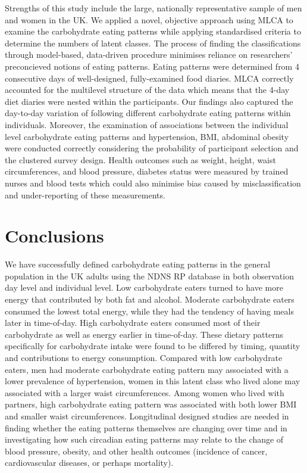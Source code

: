 Strengths of this study include the large, nationally representative sample of men and women in the UK. We applied a novel, objective approach using MLCA to examine the carbohydrate eating patterns while applying standardised criteria to determine the numbers of latent classes. The process of finding the classifications through model-based, data-driven procedure minimises reliance on researchers' preconcieved notions of eating patterns. Eating patterns were determined from 4 consecutive days of well-designed, fully-examined food diaries. MLCA correctly accounted for the multilevel structure of the data which means that the 4-day diet diaries were nested within the participants. Our findings also captured the day-to-day variation of following different carbohydrate eating patterns within individuals. Moreover, the examination of associations between the individual level carbohydrate eating patterns and hypertension, BMI, abdominal obesity were conducted correctly considering the probability of participant selection and the clustered survey design. Health outcomes such as weight, height, waist circumferences, and blood pressure, diabetes status were measured by trained nurses and blood tests which could also minimise bias caused by misclassification and under-reporting of these measurements.

\section{Conclusions}

We have successfully defined carbohydrate eating patterns in the general population in the UK adults using the NDNS RP database in both observation day level and individual level. Low carbohydrate eaters turned to have more energy that contributed by both fat and alcohol. Moderate carbohydrate eaters consumed the lowest total energy, while they had the tendency of having meals later in time-of-day. High carbohydrate eaters consumed most of their carbohydrate as well as energy earlier in time-of-day. These dietary patterns specifically for carbohydrate intake were found to be differed by timing, quantity and contributions to energy consumption. Compared with low carbohydrate eaters, men had moderate carbohydrate eating pattern may associated with a lower prevalence of hypertension, women in this latent class who lived alone may associated with a larger waist circumferences. Among women who lived with partners, high carbohydrate eating pattern was associated with both lower BMI and smaller waist circumferences. Longitudinal designed studies are needed in finding whether the eating patterns themselves are changing over time and in investigating how such circadian eating patterns may relate to the change of blood pressure, obesity, and other health outcomes (incidence of cancer, cardiovascular diseases, or perhaps mortality).